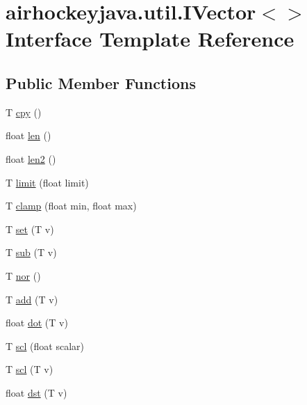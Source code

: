\hypertarget{interfaceairhockeyjava_1_1util_1_1_i_vector}{}\section{airhockeyjava.\+util.\+I\+Vector$<$$>$ Interface Template Reference}
\label{interfaceairhockeyjava_1_1util_1_1_i_vector}
\subsection*{Public Member Functions}
\begin{DoxyCompactItemize}
\item 
T \hyperlink{interfaceairhockeyjava_1_1util_1_1_i_vector_aaee9ca73a025a739da96da1a5201fb49}{cpy} ()
\item 
float \hyperlink{interfaceairhockeyjava_1_1util_1_1_i_vector_a69f343f073de369c0f48fe40af445bd4}{len} ()
\item 
float \hyperlink{interfaceairhockeyjava_1_1util_1_1_i_vector_a8351caf70fe78f9ad602f90e187d0427}{len2} ()
\item 
T \hyperlink{interfaceairhockeyjava_1_1util_1_1_i_vector_abd7bf7b47c5a2a5c36348400a04b6d87}{limit} (float limit)
\item 
T \hyperlink{interfaceairhockeyjava_1_1util_1_1_i_vector_aa4ca8940a4a32028606850aad21f909c}{clamp} (float min, float max)
\item 
T \hyperlink{interfaceairhockeyjava_1_1util_1_1_i_vector_a3afe6190018d74200e1cde064a5ffd0f}{set} (T v)
\item 
T \hyperlink{interfaceairhockeyjava_1_1util_1_1_i_vector_af33306283ef3e24fd41f2c45590f4de4}{sub} (T v)
\item 
T \hyperlink{interfaceairhockeyjava_1_1util_1_1_i_vector_a9c962ae727639289361471a00e9607be}{nor} ()
\item 
T \hyperlink{interfaceairhockeyjava_1_1util_1_1_i_vector_a11b84dd4782255d27fa079ec1c7de8c1}{add} (T v)
\item 
float \hyperlink{interfaceairhockeyjava_1_1util_1_1_i_vector_a3311933729664b72092582bc2f3fffbd}{dot} (T v)
\item 
T \hyperlink{interfaceairhockeyjava_1_1util_1_1_i_vector_a9a812e3d9cdb24f31f4b4cc61e7126f1}{scl} (float scalar)
\item 
T \hyperlink{interfaceairhockeyjava_1_1util_1_1_i_vector_ae9d23d3f886278fa07237646018df5fa}{scl} (T v)
\item 
float \hyperlink{interfaceairhockeyjava_1_1util_1_1_i_vector_a7af40f159cd3ed243385c337f305e3c2}{dst} (T v)

\end{DoxyCompactItemize}
